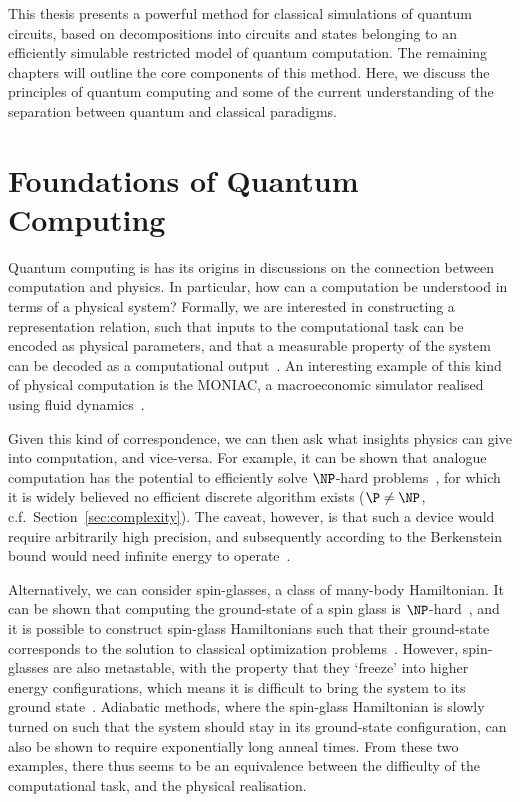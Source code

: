 This thesis presents a powerful method for classical simulations of quantum circuits, based on decompositions into circuits and states belonging to an efficiently simulable restricted model of quantum computation. The remaining chapters will outline the core components of this method. Here, we discuss the principles of quantum computing and some of the current understanding of the separation between quantum and classical paradigms.
\section{Foundations of Quantum Computing}
Quantum computing is has its origins in discussions on the connection between computation and physics. In particular, how can a computation be understood in terms of a physical system? Formally, we are interested in constructing a representation relation, such that inputs to the computational task can be encoded as physical parameters, and that a measurable property of the system can be decoded as a computational output~\cite{Horsman2014}. An interesting example of this kind of physical computation is the MONIAC, a macroeconomic simulator realised using fluid dynamics~\cite{Bissell2007}.\par
Given this kind of correspondence, we can then ask what insights physics can give into computation, and vice-versa. For example, it can be shown that analogue computation has the potential to efficiently solve $\NP$-hard problems~\cite{Schonhage1979}, for which it is widely believed no efficient discrete algorithm exists ($\P \neq \NP$, c.f.\ Section~\ref{sec:complexity}). The caveat, however, is that such a device would require arbitrarily high precision, and subsequently according to the Berkenstein bound would need infinite energy to operate~\cite{Aaronson2005}.\par
Alternatively, we can consider spin-glasses, a class of many-body Hamiltonian. It can be shown that computing the ground-state of a spin glass is $\NP$-hard~\cite{Barahona1982}, and it is possible to construct spin-glass Hamiltonians such that their ground-state corresponds to the solution to classical optimization problems~\cite{Choi2010,Lucas2014}. However, spin-glasses are also metastable, with the property that they `freeze' into higher energy configurations, which means it is difficult to bring the system to its ground state~\cite{Edwards1975}. Adiabatic methods, where the spin-glass Hamiltonian is slowly turned on such that the system should stay in its ground-state configuration, can also be shown to require exponentially long anneal times. From these two examples, there thus seems to be an equivalence between the difficulty of the computational task, and the physical realisation.\par
